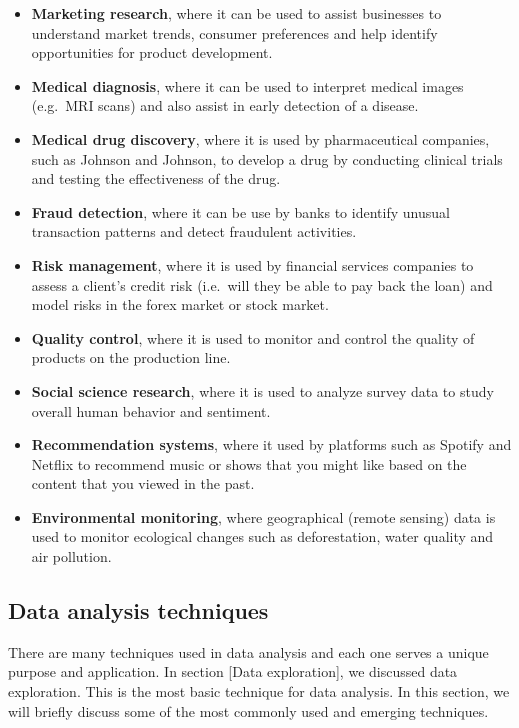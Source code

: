 \documentclass[
]{book}
\begin{document}
\begin{itemize}
\item
  \textbf{Marketing research}, where it can be used to assist businesses to understand market trends, consumer preferences and help identify opportunities for product development.
\item
  \textbf{Medical diagnosis}, where it can be used to interpret medical images (e.g.~MRI scans) and also assist in early detection of a disease.
\item
  \textbf{Medical drug discovery}, where it is used by pharmaceutical companies, such as Johnson and Johnson, to develop a drug by conducting clinical trials and testing the effectiveness of the drug.
\item
  \textbf{Fraud detection}, where it can be use by banks to identify unusual transaction patterns and detect fraudulent activities.
\item
  \textbf{Risk management}, where it is used by financial services companies to assess a client's credit risk (i.e.~will they be able to pay back the loan) and model risks in the forex market or stock market.
\item
  \textbf{Quality control}, where it is used to monitor and control the quality of products on the production line.
\item
  \textbf{Social science research}, where it is used to analyze survey data to study overall human behavior and sentiment.
\item
  \textbf{Recommendation systems}, where it used by platforms such as Spotify and Netflix to recommend music or shows that you might like based on the content that you viewed in the past.
\item
  \textbf{Environmental monitoring}, where geographical (remote sensing) data is used to monitor ecological changes such as deforestation, water quality and air pollution.
\end{itemize}

\subsection{Data analysis techniques}\label{data-analysis-techniques}

There are many techniques used in data analysis and each one serves a unique purpose and application. In section {[}Data exploration{]}, we discussed data exploration. This is the most basic technique for data analysis. In this section, we will briefly discuss some of the most commonly used and emerging techniques.
\end{document}
